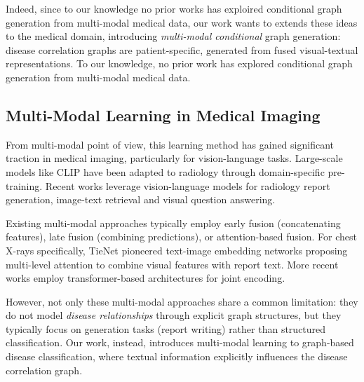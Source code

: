 \documentclass[
  journal=noname,
  manuscript=draft,
  year=,
  volume=,
]{cup-journal}
\begin{document}
Indeed, since to our knowledge no prior works has exploired conditional graph
generation from multi-modal medical data, our work wants to extends these ideas to the medical domain, 
introducing \textit{multi-modal conditional} graph generation: disease correlation 
graphs are patient-specific, generated from fused visual-textual 
representations. To our knowledge, no prior work has explored 
conditional graph generation from multi-modal medical data.

\subsection{Multi-Modal Learning in Medical Imaging}
\label{subsec:multimodal}

From multi-modal point of view, this learning method has gained significant traction in medical 
imaging, particularly for vision-language tasks. Large-scale models 
like CLIP\autocite{radford2021learningtransferablevisualmodels} have been adapted to radiology through 
domain-specific pre-training\autocite{zhang2025biomedclipmultimodalbiomedicalfoundation}. Recent works 
leverage vision-language models for radiology report generation\autocite{wang2023r2gengptradiologyreportgeneration}, 
image-text retrieval\autocite{wang2022medclipcontrastivelearningunpaired} and visual question answering\autocite{li2023llavamedtraininglargelanguageandvision}.

Existing multi-modal approaches typically employ early fusion 
(concatenating features), late fusion (combining predictions), or 
attention-based fusion\autocite{jiang2021fusionmedicalimagingelectronic}. For chest X-rays 
specifically, TieNet\autocite{wang2018tienettextimageembeddingnetwork} pioneered text-image 
embedding networks proposing multi-level attention to combine visual 
features with report text. More recent works\autocite{chen2022multimodalmaskedautoencodersmedical} employ transformer-based 
architectures for joint encoding.

However, not only these multi-modal approaches share a common limitation: they 
do not model \textit{disease relationships} through explicit graph 
structures, but they typically focus on generation tasks (report 
writing) rather than structured classification. Our work, instead, introduces 
multi-modal learning to graph-based disease classification, where 
textual information explicitly influences the disease correlation graph.

\end{document}
